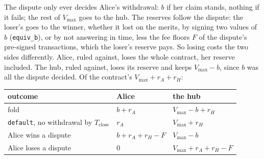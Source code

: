 \documentclass[11pt]{article}
\newcommand{\vmax}{V_{\max}}
\newcommand{\Tc}{T_{\mathrm{close}}}
\newcommand{\tx}[1]{\texttt{#1}}
\begin{document}
The dispute only ever decides Alice's withdrawal: $b$ if her claim
stands, nothing if it fails; the rest of $\vmax$ goes to the hub. The
reserves follow the dispute: the loser's goes to the winner, whether
it lost on the merits, by signing two values of $b$ (\tx{equiv\_b}), or
by not answering in time, less the fee floors $F$ of the dispute's
pre-signed transactions, which the loser's reserve pays. So losing costs
the two sides differently. Alice, ruled against, loses the whole
contract, her reserve included. The hub, ruled against, loses its
reserve and keeps $\vmax - b$, since $b$ was all the dispute decided. Of
the contract's $\vmax + r_A + r_H$:
\begin{center}
\small
\begin{tabular}{lll}
\toprule
outcome & Alice & the hub \\
\midrule
fold & $b + r_A$ & $\vmax - b + r_H$ \\
\tx{default}, no withdrawal by $\Tc$ & $r_A$ & $\vmax + r_H$ \\
Alice wins a dispute\footnotemark & $b + r_A + r_H - F$ & $\vmax - b$ \\
Alice loses a dispute & $0$ & $\vmax + r_A + r_H - F$ \\
\bottomrule
\end{tabular}
\end{center}
\end{document}
